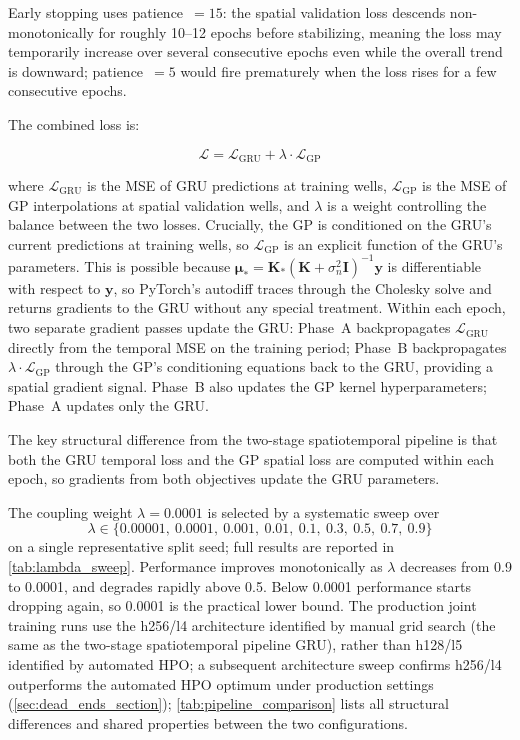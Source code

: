 Early stopping uses patience~$= 15$: the spatial validation loss descends non-monotonically
for roughly 10--12 epochs before stabilizing, meaning the loss may temporarily increase over
several consecutive epochs even while the overall trend is downward; patience~$= 5$ would
fire prematurely when the loss rises for a few consecutive epochs.

The combined loss is:

\begin{equation}
  \mathcal{L} = \mathcal{L}_{\text{GRU}} + \lambda \cdot \mathcal{L}_{\text{GP}}
  \label{eq:joint_loss}
\end{equation}

where $\mathcal{L}_{\text{GRU}}$ is the MSE of GRU predictions at training wells,
$\mathcal{L}_{\text{GP}}$ is the MSE of GP interpolations at spatial validation wells,
and $\lambda$ is a weight controlling the balance between the two losses.
Crucially, the GP is conditioned on the GRU's current predictions at training wells, so
$\mathcal{L}_{\text{GP}}$ is an explicit function of the GRU's parameters.
This is possible because $\boldsymbol{\mu}_* = \mathbf{K}_*(\mathbf{K} + \sigma_n^2\mathbf{I})^{-1}\mathbf{y}$ is differentiable with respect to $\mathbf{y}$, so PyTorch's autodiff traces through the Cholesky solve and returns gradients to the GRU without any special treatment.
Within each epoch, two separate gradient passes update the GRU:
Phase~A backpropagates $\mathcal{L}_{\text{GRU}}$ directly from the temporal MSE on the
training period; Phase~B backpropagates $\lambda \cdot \mathcal{L}_{\text{GP}}$ through the
GP's conditioning equations back to the GRU, providing a spatial gradient signal.
Phase~B also updates the GP kernel hyperparameters; Phase~A updates only the GRU.

The key structural difference from the two-stage spatiotemporal pipeline is that both the GRU temporal loss
and the GP spatial loss are computed within each epoch, so gradients from both objectives
update the GRU parameters.

The coupling weight $\lambda = 0.0001$ is selected by a systematic sweep over
\begin{equation*}
  \lambda \in \{0.00001,\ 0.0001,\ 0.001,\ 0.01,\ 0.1,\ 0.3,\ 0.5,\ 0.7,\ 0.9\}
\end{equation*}
on a single representative split seed; full results are reported in
\cref{tab:lambda_sweep}. Performance improves monotonically as $\lambda$ decreases from 0.9
to 0.0001, and degrades rapidly above 0.5. Below 0.0001
performance starts dropping again, so 0.0001 is the practical lower bound.
The production joint training runs use the h256/l4 architecture identified by manual grid search (the same as the two-stage spatiotemporal pipeline GRU), rather than h128/l5 identified by automated HPO; a subsequent architecture sweep confirms h256/l4 outperforms the automated HPO optimum under production settings (\cref{sec:dead_ends_section}); \cref{tab:pipeline_comparison} lists all structural differences and shared properties between the two configurations.


